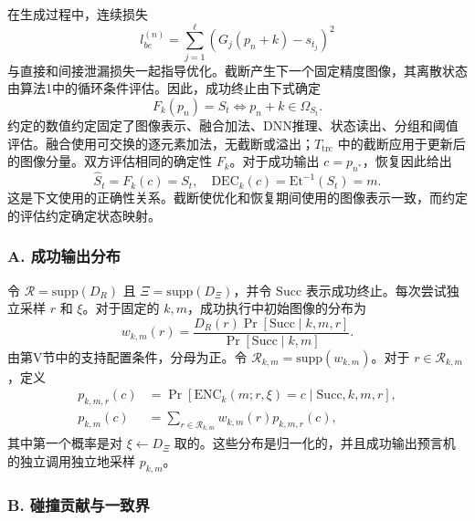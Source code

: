 在生成过程中，连续损失
\begin{equation}
l_{be}^{(n)} = \sum_{j=1}^\ell (G_j(p_n + k) - s_{t_j})^2 \tag{26}
\end{equation}
与直接和间接泄漏损失一起指导优化。截断产生下一个固定精度图像，其离散状态由算法1中的循环条件评估。因此，成功终止由下式确定
\begin{equation}
F_k(p_n) = S_t \iff p_n + k \in \Omega_{S_t}. \tag{27}
\end{equation}
约定的数值约定固定了图像表示、融合加法、DNN推理、状态读出、分组和阈值评估。融合使用可交换的逐元素加法，无截断或溢出；\(T_{\mathrm{trc}}\) 中的截断应用于更新后的图像分量。双方评估相同的确定性 \(F_k\)。对于成功输出 \(c = p_{n^*}\)，恢复因此给出
\begin{equation}
\widehat{S}_t = F_k(c) = S_t, \quad \mathrm{DEC}_k(c) = \mathrm{Et}^{-1}(S_t) = m. \tag{28}
\end{equation}
这是下文使用的正确性关系。截断使优化和恢复期间使用的图像表示一致，而约定的评估约定确定状态映射。

\subsubsection*{A. 成功输出分布}
令 \(\mathcal{R} = \mathrm{supp}(D_R)\) 且 \(\Xi = \mathrm{supp}(D_\Xi)\)，并令 \(\mathrm{Succ}\) 表示成功终止。每次尝试独立采样 \(r\) 和 \(\xi\)。对于固定的 \(k, m\)，成功执行中初始图像的分布为
\begin{equation}
w_{k,m}(r) = \frac{D_R(r) \Pr[\mathrm{Succ} \mid k, m, r]}{\Pr[\mathrm{Succ} \mid k, m]}. \tag{29}
\end{equation}
由第V节中的支持配置条件，分母为正。令 \(\mathcal{R}_{k,m} = \mathrm{supp}(w_{k,m})\)。对于 \(r \in \mathcal{R}_{k,m}\)，定义
\begin{equation}
\begin{aligned}
p_{k,m,r}(c) &= \Pr[\mathrm{ENC}_k(m; r, \xi) = c \mid \mathrm{Succ}, k, m, r], \\
p_{k,m}(c) &= \sum_{r \in \mathcal{R}_{k,m}} w_{k,m}(r) p_{k,m,r}(c), 
\end{aligned} \tag{30}
\end{equation}
其中第一个概率是对 \(\xi \leftarrow D_\Xi\) 取的。这些分布是归一化的，并且成功输出预言机的独立调用独立地采样 \(p_{k,m}\)。
\subsubsection*{B. 碰撞贡献与一致界}

